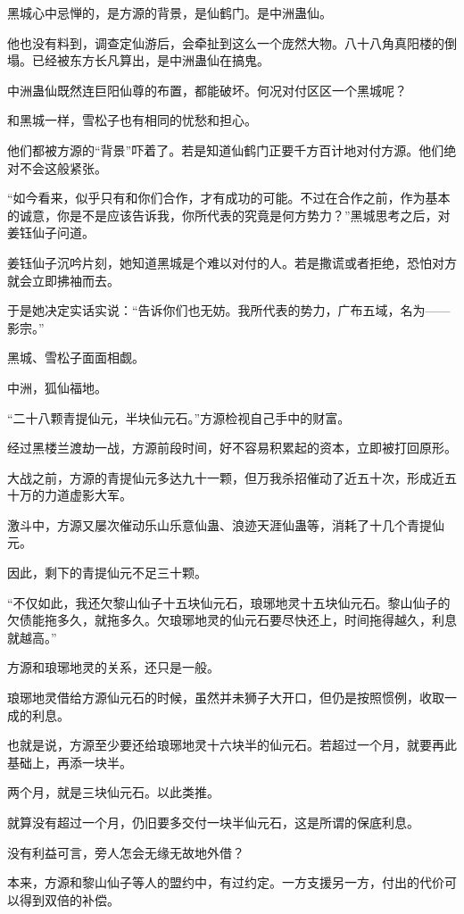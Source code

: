 \begin{this_body}
黑城心中忌惮的，是方源的背景，是仙鹤门。是中洲蛊仙。

他也没有料到，调查定仙游后，会牵扯到这么一个庞然大物。八十八角真阳楼的倒塌。已经被东方长凡算出，是中洲蛊仙在搞鬼。

中洲蛊仙既然连巨阳仙尊的布置，都能破坏。何况对付区区一个黑城呢？

和黑城一样，雪松子也有相同的忧愁和担心。

他们都被方源的“背景”吓着了。若是知道仙鹤门正要千方百计地对付方源。他们绝对不会这般紧张。

“如今看来，似乎只有和你们合作，才有成功的可能。不过在合作之前，作为基本的诚意，你是不是应该告诉我，你所代表的究竟是何方势力？”黑城思考之后，对姜钰仙子问道。

姜钰仙子沉吟片刻，她知道黑城是个难以对付的人。若是撒谎或者拒绝，恐怕对方就会立即拂袖而去。

于是她决定实话实说：“告诉你们也无妨。我所代表的势力，广布五域，名为——影宗。”

黑城、雪松子面面相觑。

中洲，狐仙福地。

“二十八颗青提仙元，半块仙元石。”方源检视自己手中的财富。

经过黑楼兰渡劫一战，方源前段时间，好不容易积累起的资本，立即被打回原形。

大战之前，方源的青提仙元多达九十一颗，但万我杀招催动了近五十次，形成近五十万的力道虚影大军。

激斗中，方源又屡次催动乐山乐意仙蛊、浪迹天涯仙蛊等，消耗了十几个青提仙元。

因此，剩下的青提仙元不足三十颗。

“不仅如此，我还欠黎山仙子十五块仙元石，琅琊地灵十五块仙元石。黎山仙子的欠债能拖多久，就拖多久。欠琅琊地灵的仙元石要尽快还上，时间拖得越久，利息就越高。”

方源和琅琊地灵的关系，还只是一般。

琅琊地灵借给方源仙元石的时候，虽然并未狮子大开口，但仍是按照惯例，收取一成的利息。

也就是说，方源至少要还给琅琊地灵十六块半的仙元石。若超过一个月，就要再此基础上，再添一块半。

两个月，就是三块仙元石。以此类推。

就算没有超过一个月，仍旧要多交付一块半仙元石，这是所谓的保底利息。

没有利益可言，旁人怎会无缘无故地外借？

本来，方源和黎山仙子等人的盟约中，有过约定。一方支援另一方，付出的代价可以得到双倍的补偿。


\end{this_body}
